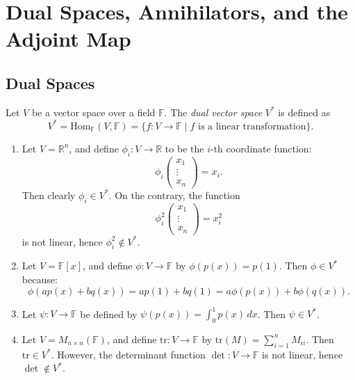 \chapter{Dual Spaces, Annihilators, and the Adjoint Map}
\section{Dual Spaces}
\begin{definition}\label{def:dual-space}
Let $V$ be a vector space over a field $\mathbb{F}$. The \emph{dual vector space} $V^*$ is defined as
\[
V^* = \mathrm{Hom}_{\mathbb{F}}(V, \mathbb{F}) = \{ f : V \to \mathbb{F} \mid f \text{ is a linear transformation} \}.
\]
\end{definition}

\begin{example}
\leavevmode
\begin{enumerate}
  \item Let $V = \mathbb{R}^n$, and define $\phi_i : V \to \mathbb{R}$ to be the $i$-th coordinate function:
  \[
  \phi_i \begin{pmatrix} x_1 \\ \vdots \\ x_n \end{pmatrix} = x_i.
  \]
  Then clearly $\phi_i \in V^*$. On the contrary, the function
  \[
  \phi_i^2 \begin{pmatrix} x_1 \\ \vdots \\ x_n \end{pmatrix} = x_i^2
  \]
  is not linear, hence $\phi_i^2 \notin V^*$.

  \item Let $V = \mathbb{F}[x]$, and define $\phi : V \to \mathbb{F}$ by $\phi(p(x)) = p(1)$. Then $\phi \in V^*$ because:
  \[
  \phi(ap(x) + bq(x)) = ap(1) + bq(1) = a \phi(p(x)) + b \phi(q(x)).
  \]

  \item Let $\psi : V \to \mathbb{F}$ be defined by $\psi(p(x)) = \int_0^1 p(x)\,dx$. Then $\psi \in V^*$.

  \item Let $V = M_{n \times n}(\mathbb{F})$, and define $\mathrm{tr} : V \to \mathbb{F}$ by $\mathrm{tr}(M) = \sum_{i=1}^n M_{ii}$. Then $\mathrm{tr} \in V^*$. However, the determinant function $\det : V \to \mathbb{F}$ is not linear, hence $\det \notin V^*$.
\end{enumerate}
\end{example}


